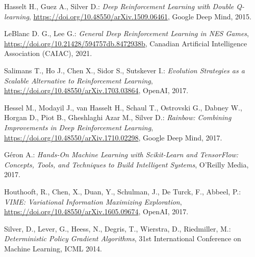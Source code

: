 \documentclass{pginz}
\begin{document}

%

\setcounter{page}{2}

%
%

\tableofcontents
{}

%
%






\begin{thebibliography}{99}

Hasselt H., Guez A., Silver D.:
\emph{Deep Reinforcement Learning with Double Q-learning}, 
\url{https://doi.org/10.48550/arXiv.1509.06461},
Google Deep Mind, 2015.

LeBlanc D. G., Lee G.:
\emph{General Deep Reinforcement Learning in NES Games}, 
\url{https://doi.org/10.21428/594757db.8472938b},
Canadian Artificial Intelligence Association (CAIAC), 2021. 

Salimans T., Ho J., Chen X., Sidor S., Sutskever I.:
\emph{Evolution Strategies as a Scalable Alternative to Reinforcement Learning}, 
\url{https://doi.org/10.48550/arXiv.1703.03864}, OpenAI, 2017.

Hessel M., Modayil J., van Hasselt H., Schaul T., Ostrovski G., Dabney W., Horgan D., Piot B., Gheshlaghi Azar M., Silver D.:
\emph{Rainbow: Combining Improvements in Deep Reinforcement Learning}, 
\url{https://doi.org/10.48550/arXiv.1710.02298},
Google Deep Mind, 2017.

Géron A.:
\emph{Hands-On Machine Learning with Scikit-Learn and TensorFlow: Concepts, Tools, and Techniques to Build Intelligent Systems}, 
O'Reilly Media, 2017.

 Houthooft, R., Chen, X., Duan, Y., Schulman, J., De Turck, F., Abbeel, P.: \emph{VIME: Variational Information Maximizing Exploration},  \url{https://doi.org/10.48550/arXiv.1605.09674}, OpenAI, 2017.

 Silver, D., Lever, G., Heess, N., Degris, T., Wierstra, D., Riedmiller, M.: \emph{Deterministic Policy Gradient Algorithms}, 31st International Conference on Machine Learning, ICML 2014.

\end{thebibliography}



\begin{appendices}
%
%
\end{appendices}
\end{document}
